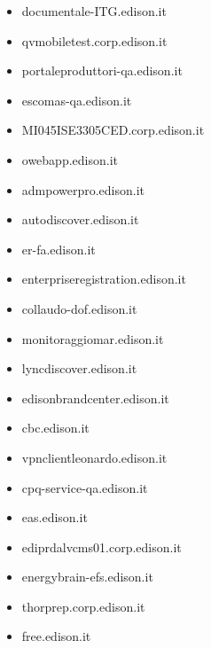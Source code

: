 \documentclass{article}
\begin{document}
\begin{itemize}
        \item documentale-ITG.edison.it
    
        \item qvmobiletest.corp.edison.it
    
        \item portaleproduttori-qa.edison.it
    
        \item escomas-qa.edison.it
    
        \item MI045ISE3305CED.corp.edison.it
    
        \item owebapp.edison.it
    
        \item admpowerpro.edison.it
    
        \item autodiscover.edison.it
    
        \item er-fa.edison.it
    
        \item enterpriseregistration.edison.it
    
        \item collaudo-dof.edison.it
    
        \item monitoraggiomar.edison.it
    
        \item lyncdiscover.edison.it
    
        \item edisonbrandcenter.edison.it
    
        \item cbc.edison.it
    
        \item vpnclientleonardo.edison.it
    
        \item cpq-service-qa.edison.it
    
        \item eas.edison.it
    
        \item ediprdalvcms01.corp.edison.it
    
        \item energybrain-efs.edison.it
    
        \item thorprep.corp.edison.it
    
        \item free.edison.it
    

\end{itemize}
\end{document}
